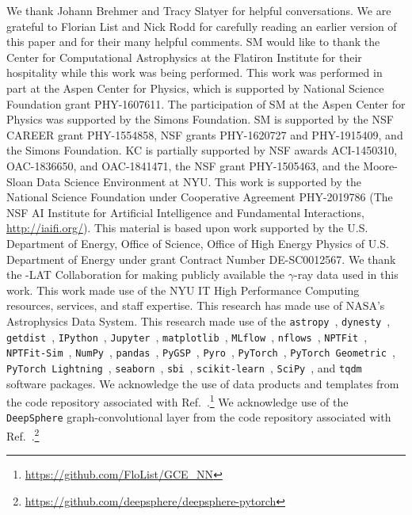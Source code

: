 \documentclass[prd,aps,10pt,nofootinbib,twocolumn,superscriptaddress,preprintnumbers,balancelastpage,longbibliography,floatfix]{revtex4-2}
\begin{document}
\begin{acknowledgments}

We thank Johann Brehmer and Tracy Slatyer for helpful conversations. We are grateful to Florian List and Nick Rodd for carefully reading an earlier version of this paper and for their many helpful comments.
SM would like to thank the Center for Computational Astrophysics at the Flatiron Institute for their hospitality while this work was being performed. 
This work was performed in part at the Aspen Center for Physics, which is supported by National Science Foundation grant PHY-1607611.
The participation of SM at the Aspen Center for Physics was supported by the Simons Foundation.
SM is supported by the NSF CAREER grant PHY-1554858, NSF grants PHY-1620727 and PHY-1915409, and the Simons Foundation. 
KC is partially supported by NSF awards ACI-1450310, OAC-1836650, and OAC-1841471, the NSF grant PHY-1505463, and the Moore-Sloan Data Science Environment at NYU. 
This work is supported by the National Science Foundation under Cooperative Agreement PHY-2019786 (The NSF AI Institute for Artificial Intelligence and Fundamental Interactions, \url{http://iaifi.org/}).
This material is based upon work supported by the U.S. Department of Energy, Office of Science, Office of High Energy Physics of U.S. Department of Energy under grant Contract Number DE-SC0012567.
We thank the \Fermi-LAT Collaboration for making publicly available the $\gamma$-ray data used in this work.
This work made use of the NYU IT High Performance Computing resources, services, and staff expertise. 
This research has made use of NASA's Astrophysics Data System. 
This research made use of the \texttt{astropy}~\cite{Price-Whelan:2018hus,Robitaille:2013mpa}, \texttt{dynesty}~\cite{Speagle_2020}, \texttt{getdist}~\cite{Lewis:2019xzd}, \texttt{IPython}~\cite{PER-GRA:2007}, \texttt{Jupyter}~\cite{Kluyver2016JupyterN}, \texttt{matplotlib}~\cite{Hunter:2007}, \texttt{MLflow}~\cite{10.1145/3399579.3399867}, \texttt{nflows}~\cite{nflows}, \texttt{NPTFit}~\cite{Mishra-Sharma:2016gis}, \texttt{NPTFit-Sim}~\cite{NPTFit-Sim}, \texttt{NumPy}~\cite{harris2020array}, \texttt{pandas}~\cite{pandas:2010}, \texttt{PyGSP}~\cite{michael_defferrard_2017_1003158}, \texttt{Pyro}~\cite{bingham2019pyro}, \texttt{PyTorch}~\cite{NEURIPS2019_9015}, \texttt{PyTorch Geometric}~\cite{Fey/Lenssen/2019}, \texttt{PyTorch Lightning}~\cite{william_falcon_2020_3828935}, \texttt{seaborn}~\cite{seaborn}, \texttt{sbi}~\cite{tejero-cantero2020sbi}, \texttt{scikit-learn}~\cite{JMLR:v12:pedregosa11a}, \texttt{SciPy}~\cite{2020SciPy-NMeth}, and \texttt{tqdm}~\cite{casper_da_costa_luis_2021_5517697} software packages. We acknowledge the use of data products and templates from the code repository associated with Ref.~\cite{List:2020mzd}.\footnote{\url{https://github.com/FloList/GCE_NN}} We acknowledge use of the \texttt{DeepSphere} graph-convolutional layer from the code repository associated with Ref.~\cite{DBLP:conf/iclr/DefferrardMGP20}.\footnote{\url{https://github.com/deepsphere/deepsphere-pytorch}}
\end{acknowledgments}
\end{document}

